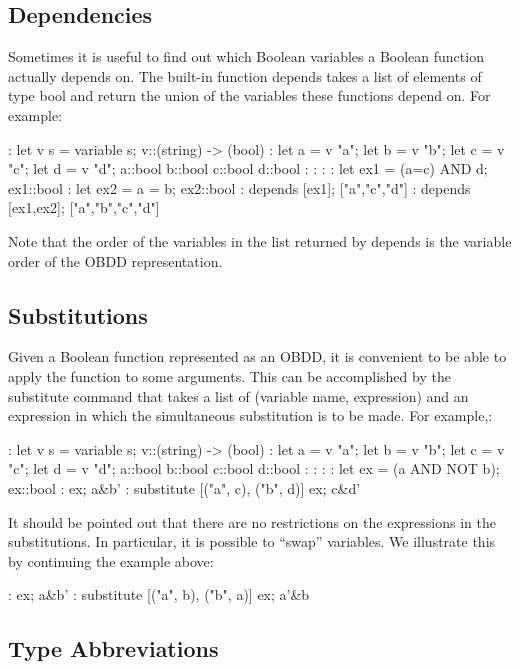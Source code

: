 \subsection{Dependencies}

Sometimes it is useful to find out which Boolean variables a
Boolean function actually depends on.
The built-in function depends%
%
{} takes a list of elements of type
bool and return the union of the variables these functions depend on.
For example:
\begin{hol}
: let v s = variable s;
v::(string) -> (bool)
: let a = v "a"; let b = v "b"; let c = v "c"; let d = v "d";
a::bool
b::bool
c::bool
d::bool
: : : : let ex1 = (a=c) AND d;
ex1::bool
: let ex2 = a = b;
ex2::bool
: depends [ex1];
["a","c","d"]
: depends [ex1,ex2];
["a","b","c","d"]
\end{hol}

Note that the order of the variables in the list returned by depends
is the variable order of the OBDD representation.

\subsection{Substitutions}

Given a Boolean function represented as an OBDD, it is convenient to
be able to apply the function to some arguments.
This can be accomplished by the substitute%
%
{} command that takes a
list of (variable name, expression) and an expression in which the
simultaneous substitution%
%
{} is to be made.
For example,:
\begin{hol}
: let v s = variable s;
v::(string) -> (bool)
: let a = v "a"; let b = v "b"; let c = v "c"; let d = v "d";
a::bool
b::bool
c::bool
d::bool
: : : : let ex = (a AND NOT b);
ex::bool
: ex;
a&b'
: substitute [("a", c), ("b", d)] ex;
c&d'
\end{hol}

It should be pointed out that there are no restrictions on the expressions
in the substitutions.
In particular, it is possible to ``swap'' variables.
We illustrate this by continuing the example above:
\begin{hol}
: ex;
a&b'
: substitute [("a", b), ("b", a)] ex;
a'&b
\end{hol}

\subsection{Type Abbreviations}

